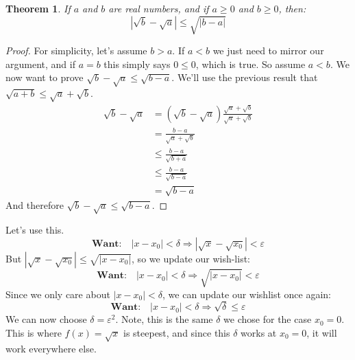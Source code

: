 \documentclass{article}
\theoremstyle{normal}
\theoremstyle{plain}
\newtheorem{theorem}{Theorem}
\begin{document}
    \begin{theorem}
        If $a$ and $b$ are real numbers, and if $a\geq{0}$ and $b\geq{0}$,
        then:
        \begin{equation}
            |\sqrt{b}-\sqrt{a}|
            \leq\sqrt{|b-a|}
        \end{equation}
    \end{theorem}
    \begin{proof}
        For simplicity, let's assume $b>a$. If $a<b$ we just need to
        mirror our argument, and if $a=b$ this simply says $0\leq{0}$, which is
        true. So assume $a<b$. We now want to prove
        $\sqrt{b}-\sqrt{a}\leq\sqrt{b-a}$. We'll use the previous result
        that $\sqrt{a+b}\leq\sqrt{a}+\sqrt{b}$.
        \begin{align}
            \sqrt{b}-\sqrt{a}
            &=(\sqrt{b}-\sqrt{a})\frac{\sqrt{a}+\sqrt{b}}{\sqrt{a}+\sqrt{b}}\\
            &=\frac{b-a}{\sqrt{a}+\sqrt{b}}\\
            &\leq\frac{b-a}{\sqrt{b+a}}\\
            &\leq\frac{b-a}{\sqrt{b-a}}\\
            &=\sqrt{b-a}
        \end{align}
        And therefore $\sqrt{b}-\sqrt{a}\leq\sqrt{b-a}$.
    \end{proof}
    Let's use this.
    \begin{equation}
        \textbf{Want:}\quad
        |x-x_{0}|<\delta
        \Rightarrow
        |\sqrt{x}-\sqrt{x_{0}}|<\varepsilon
    \end{equation}
    But $|\sqrt{x}-\sqrt{x_{0}}|\leq\sqrt{|x-x_{0}|}$, so we update our
    wish-list:
    \begin{equation}
        \textbf{Want:}\quad
        |x-x_{0}|<\delta
        \Rightarrow
        \sqrt{|x-x_{0}|}<\varepsilon
    \end{equation}
    Since we only care about $|x-x_{0}|<\delta$, we can update our wishlist
    once again:
    \begin{equation}
        \textbf{Want:}\quad
        |x-x_{0}|<\delta
        \Rightarrow
        \sqrt{\delta}\leq\varepsilon
    \end{equation}
    We can now choose $\delta=\varepsilon^{2}$. Note, this is the same
    $\delta$ we chose for the case $x_{0}=0$. This is where $f(x)=\sqrt{x}$ is
    steepest, and since this $\delta$ works at $x_{0}=0$, it will work
    everywhere else.
    \par\hfill\par
\end{document}
